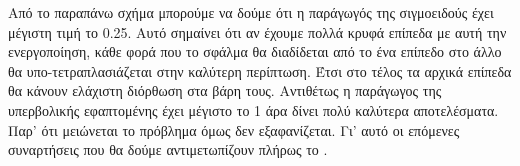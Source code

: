 \begin{figure}[H]
    \centering
    \begin{subfigure}{0.48\textwidth}
        \centering
        \caption{}
    \end{subfigure}
    \hfill
    \begin{subfigure}{0.48\textwidth}
        \centering
        \caption{}
    \end{subfigure}
    \caption{}
\end{figure}
Από το παραπάνω σχήμα μπορούμε να δούμε ότι η παράγωγός της σιγμοειδούς έχει μέγιστη τιμή το 0.25. Αυτό σημαίνει ότι αν έχουμε πολλά κρυφά επίπεδα με αυτή την ενεργοποίηση, κάθε φορά που το σφάλμα θα διαδίδεται από το ένα επίπεδο στο άλλο
θα υπο-τετραπλασιάζεται στην καλύτερη περίπτωση. Έτσι στο τέλος τα αρχικά επίπεδα θα κάνουν ελάχιστη διόρθωση στα βάρη τους. Αντιθέτως η παράγωγος της υπερβολικής εφαπτομένης έχει μέγιστο το 1 άρα δίνει πολύ καλύτερα αποτελέσματα. Παρ' ότι
μειώνεται το πρόβλημα όμως δεν εξαφανίζεται. Γι' αυτό οι επόμενες συναρτήσεις που θα δούμε αντιμετωπίζουν πλήρως το .

